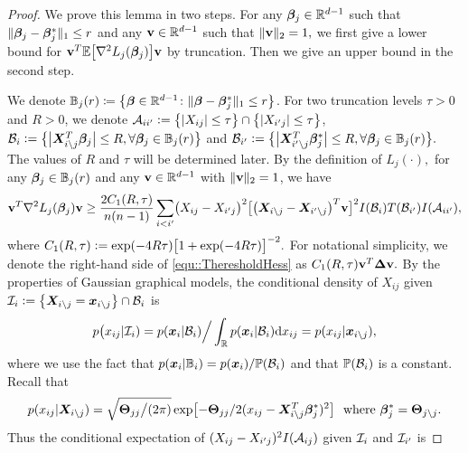 \documentclass[twoside,11pt]{article}
\newcommand{\defeq}{\vcentcolon=}
\newcommand*{\BR}{\mathbb{R}}
\newcommand*{\BB}{\mathbb{B}}
\newcommand*{\bbetas}{\bbeta^*}
\newcommand*{\bbetass}{\bbeta^*_{j}}
\newcommand{\rmnum}[1]{\romannumeral #1}
\begin{document}
\begin{proof} 
We prove this lemma in two steps. For any $\bbeta_j\in \BR^{d-1 }$ such that $ \| \bbeta_j - \bbetas_j \|_1 \leq r$ and any $\vb\in\BR^{d-1}$ such that $\| \mathbf{v}\|_2 = 1,$  we first give a lower bound for $\vb^T \EE \bigl[\nabla^2 L_j(\bbeta_j)\bigr] \vb$ by truncation. Then we give an upper bound in the second step.

\vspace{5pt}
\noindent{\bf Step (\rmnum{1}): Lower Bound of $\vb^T \EE \bigl[\nabla^2 L_j(\bbeta_j)\bigr] \vb$.} We denote $\mathbb{B}_j(r)\coloneqq \bigl\{ \bbeta\in \BR^{d-1}\colon  \| \bbeta- \bbetas_j \|_1 \leq r\bigr\}$. For two truncation levels  $\tau >0$ and $R >0$, we denote
 $\cA_{ii'} \defeq \bigl \{ | X_{ij} | \leq \tau \bigr\}  \cap \bigl \{ | X_{i'j} | \leq \tau \bigr\} $, $\cB_{i} \defeq  \bigl \{\bigl | \bX_{i \setminus j}^T \bbeta_j\bigr |\leq R, \forall \bbeta_j\in \BB_j(r)\bigr  \} $ 
 and $\cB_{i'} \defeq \bigl \{ \bigl | \bX_{i'\setminus j}^T \bbetass\bigr| \leq R, \forall \bbeta_j\in \BB_j(r)\bigr  \}.$   The values of $R$ and $\tau$ will be determined later. 
 By the definition of $L_j(\cdot), $ for any $\bbeta_j \in \BB_j(r)$ and any $\vb \in \BR^{d-1}$ with $\| \mathbf{v} \|_2 =1 $, we have 
\begin{align}\label{equ::TheresholdHess}
\mathbf{v}^T \nabla^2 L_j (\bm{\beta}_j  ) \mathbf{v}  \geq \frac{2C_1(R,\tau)}{n(n-1)} \sum_{i<i'} \bigl (X_{ij} - X_{i'j}\bigr) ^2  \bigl [\bigl(\bm{X}_{i\setminus j} - \bm{X}_{i' \setminus j}\bigr)^T \mathbf{v} \bigr]^2 I(\mathcal{B}_i)T(\mathcal{B}_{i'})  I ( \mathcal{A}_{ii'}), 
\end{align}
where $C_1(R,\tau) \defeq \exp(-4R\tau) \bigl[1  + \exp(-4R\tau)\bigr]^{-2}.$ For notational simplicity, we denote the right-hand side of \eqref{equ::TheresholdHess} as $C_1(R,\tau)\mathbf{v}^T \bm{\Delta}\mathbf{v}.$ By the properties of Gaussian graphical models, the conditional density of $X _{ij}$ given $\cI _i\defeq \bigl\{ \bX_{i\setminus j} = \bx_{i\setminus j}\bigr \} \cap \cB_i $
 is 
 \begin{align*}
 p\bigl(x_{ij} |\cI_i)  = p(\bx_i | \cB_i)\Big / \int _{\BR } p(\bx_i | \cB_i) \ud x_{ij} =  p(x_{ij}| \bx_{i \setminus j}),
 \end{align*}
 where we use the fact that $p(\bx_i | \BB_i) = p(\bx_i) / \PP(\cB_i)$ and that $\mathbb{P}(\mathcal{B}_i)$ is a constant.
 Recall that $$p(x_{ij}| \bX_{i \setminus j})  =\sqrt{ \bTheta_{jj}\big/( 2\pi)} \exp \bigl [- \bTheta_{jj}/2  (x_{ij} - \bX_{i \setminus j}^T \bbetas_{j}  )^2  \bigr ]~~\text{where}~ \bbetas_j = \bTheta_{j\setminus j}.$$ 
 Thus the conditional expectation of $(X_{ij} - X_{i'j})^2   I ( \mathcal{A}_{ij})$ given $\mathcal{I}_{i}$ and $\mathcal{I}_{i'}$ is

\end{proof}
\end{document}
